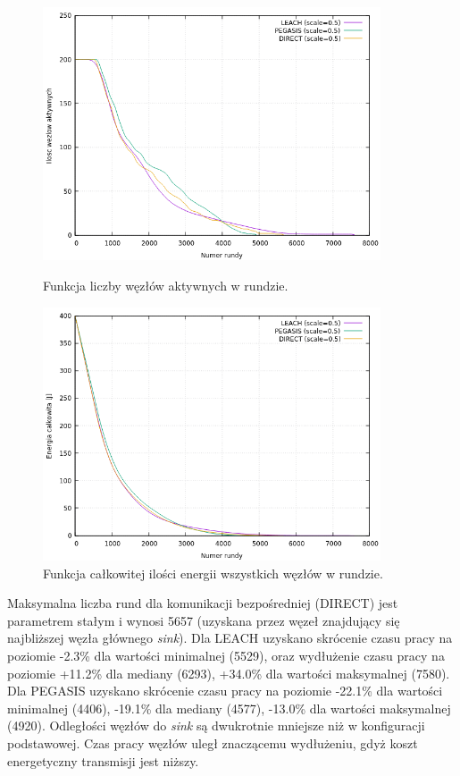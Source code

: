 \documentclass[a4paper,12pt,twoside,openany]{report}
\begin{document}
\begin{figure}[H]
 \centering
 \includegraphics[width=10cm]{images/gnuplot/test_3/nodes_in_round_xy100.png}
 \caption{Funkcja liczby węzłów aktywnych w rundzie.}
 \includegraphics[width=10cm]{images/gnuplot/test_3/energy_in_round_xy100.png}
 \caption{Funkcja całkowitej ilości energii wszystkich węzłów w rundzie.}
\end{figure}

\par
Maksymalna liczba rund dla komunikacji bezpośredniej (DIRECT) jest parametrem stałym i wynosi 5657 (uzyskana przez węzeł znajdujący się najbliższej węzła głównego \textit{sink}).
Dla LEACH uzyskano skrócenie czasu pracy na poziomie -2.3\% dla wartości minimalnej (5529), oraz wydłużenie czasu pracy na poziomie +11.2\% dla mediany (6293), +34.0\% dla wartości maksymalnej (7580).
Dla PEGASIS uzyskano skrócenie czasu pracy na poziomie -22.1\% dla wartości minimalnej (4406), -19.1\% dla mediany (4577), -13.0\% dla wartości maksymalnej (4920).
Odległości węzłów do \textit{sink} są dwukrotnie mniejsze niż w konfiguracji podstawowej. Czas pracy węzłów uległ znaczącemu wydłużeniu, gdyż koszt energetyczny transmisji jest niższy.
\end{document}
